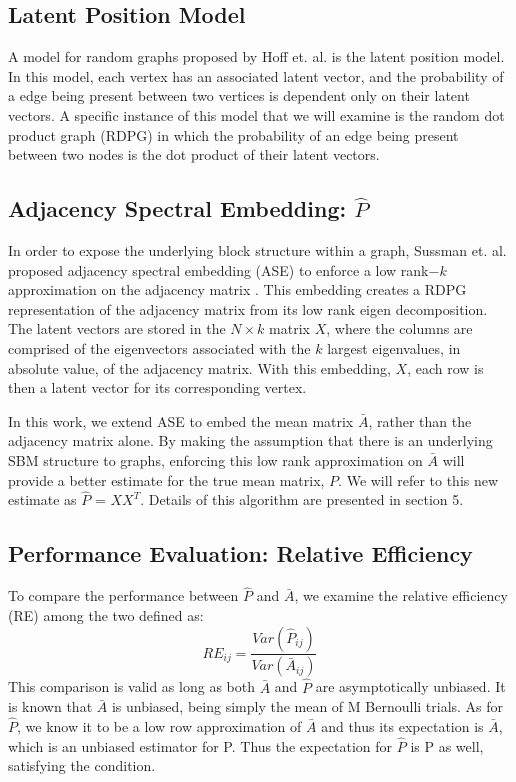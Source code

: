 \subsection{Latent Position Model}
A model for random graphs proposed by Hoff et. al. is the latent position model.  In this model, each vertex has an associated latent vector, and the probability of a edge being present between two vertices is dependent only on their latent vectors. \cite{Hoff}  A specific instance of this model that we will examine is the random dot product graph (RDPG) in which the probability of an edge being present between two nodes is the dot product of their latent vectors.\cite{Schein}

\subsection{Adjacency Spectral Embedding: $\hat{P}$}
In order to expose the underlying block structure within a graph, Sussman et. al. proposed adjacency spectral embedding (ASE) to enforce a low rank$-k$ approximation on the adjacency matrix \cite{Sussman2012}.  This embedding creates a RDPG representation of the adjacency matrix from its low rank eigen decomposition.  The latent vectors are stored in the $N \times k$ matrix $X$, where the columns are comprised of the eigenvectors associated with the $k$ largest eigenvalues, in absolute value, of the adjacency matrix.  With this embedding, $X$, each row is then a latent vector for its corresponding vertex.

In this work, we extend ASE to embed the mean matrix $\bar{A}$, rather than the adjacency matrix alone.  By making the assumption that there is an underlying SBM structure to graphs, enforcing this low rank approximation on $\bar{A}$ will provide a better estimate for the true mean matrix, $P$.  We will refer to this new estimate as $\hat{P}$ = $XX^T$.  Details of this algorithm are presented in section 5.
\subsection{Performance Evaluation: Relative Efficiency}
To compare the performance between $\hat{P}$ and $\bar{A}$, we examine the relative efficiency (RE) among the two defined as:
\begin{equation}
RE_{ij} = \frac{Var(\hat{P}_{ij})}{Var(\bar{A}_{ij})}
\end{equation}
This comparison is valid as long as both $\bar{A}$ and $\hat{P}$ are asymptotically unbiased.  It is known that $\bar{A}$ is unbiased, being simply the mean of M Bernoulli trials. As for $\hat{P}$, we know it to be a low row approximation of $\bar{A}$ and thus its expectation is $\bar{A}$, which is an unbiased estimator for P. Thus the expectation for $\hat{P}$ is P as well, satisfying the condition.
